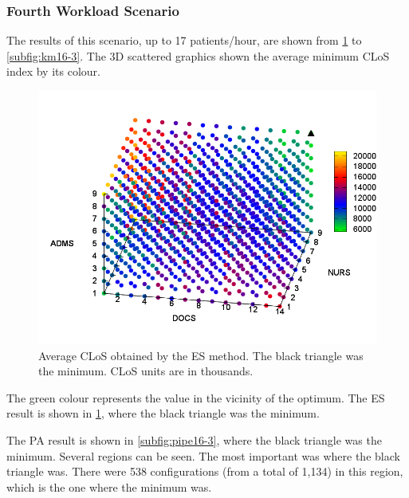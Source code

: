 \documentclass[11pt]{article} %
\begin{document}
\subsubsection{Fourth Workload Scenario}

The results of this scenario, up to 17 patients/hour, are shown from
\ref{subfig:es16-3} to \ref{subfig:km16-3}. The 3D scattered graphics
shown the average minimum CLoS index by its colour. 

\begin{figure}[H]
\centering{}\includegraphics[width=1\columnwidth,height=0.19\paperheight]{figs4/v03/6400-602-100-Cost_times_LoS-exh-min}
\caption{Average CLoS obtained by the ES method. The black triangle was the
minimum. CLoS units are in thousands.\label{subfig:es16-3}}
\end{figure}
The green colour represents the value in the vicinity of the optimum.
The ES result is shown in \ref{subfig:es16-3}, where the black triangle
was the minimum. 

The PA result is shown in \ref{subfig:pipe16-3}, where the black
triangle was the minimum. Several regions can be seen. The most important
was where the black triangle was. There were 538 configurations (from
a total of 1,134) in this region, which is the one where the minimum
was.
\end{document}
